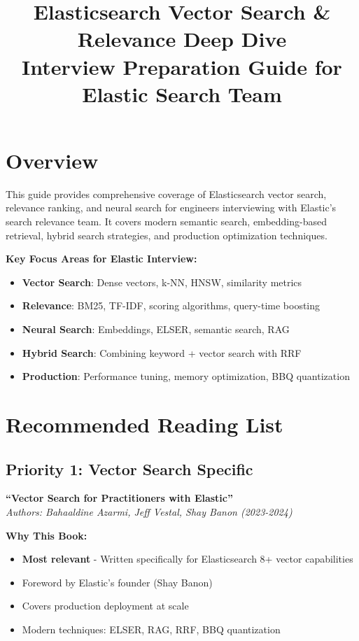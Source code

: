 \documentclass[10pt]{article}
\title{\textbf{Elasticsearch Vector Search \& Relevance Deep Dive} \\ \large Interview Preparation Guide for Elastic Search Team}
\author{}
\date{}
\begin{document}
\maketitle

\section*{Overview}

This guide provides comprehensive coverage of Elasticsearch vector search, relevance ranking, and neural search for engineers interviewing with Elastic's search relevance team. It covers modern semantic search, embedding-based retrieval, hybrid search strategies, and production optimization techniques.

\textbf{Key Focus Areas for Elastic Interview:}
\begin{itemize}
\item \textbf{Vector Search}: Dense vectors, k-NN, HNSW, similarity metrics
\item \textbf{Relevance}: BM25, TF-IDF, scoring algorithms, query-time boosting
\item \textbf{Neural Search}: Embeddings, ELSER, semantic search, RAG
\item \textbf{Hybrid Search}: Combining keyword + vector search with RRF
\item \textbf{Production}: Performance tuning, memory optimization, BBQ quantization
\end{itemize}

\section{Recommended Reading List}

\subsection{Priority 1: Vector Search Specific}

\textbf{``Vector Search for Practitioners with Elastic''} \\
\textit{Authors: Bahaaldine Azarmi, Jeff Vestal, Shay Banon (2023-2024)}

\textbf{Why This Book:}
\begin{itemize}[leftmargin=*]
\item \textbf{Most relevant} - Written specifically for Elasticsearch 8+ vector capabilities
\item Foreword by Elastic's founder (Shay Banon)
\item Covers production deployment at scale
\item Modern techniques: ELSER, RAG, RRF, BBQ quantization
\end{itemize}
\end{document}
